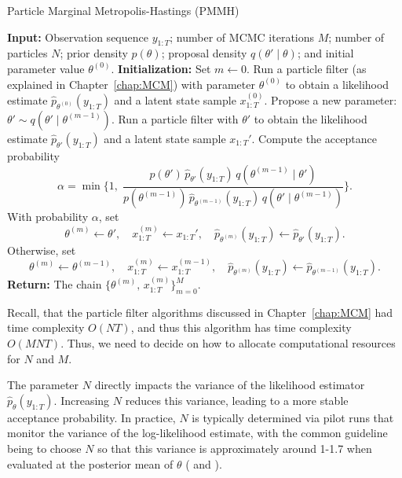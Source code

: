 \begin{algorithm}[H]
	\caption{Particle Marginal Metropolis-Hastings (PMMH)}
	\label{algo:PMMH}
	\begin{algorithmic}[1]
		\State \textbf{Input:} Observation sequence \(y_{1:T}\); number of MCMC iterations \(M\); number of particles \(N\); prior density \(p(\theta)\); proposal density \(q(\theta'\mid\theta)\); and initial parameter value \(\theta^{(0)}\).
		\State \textbf{Initialization:} Set \(m \gets 0\). Run a particle filter (as explained in Chapter~\ref{chap:MCM}) with parameter \(\theta^{(0)}\) to obtain a likelihood estimate \(\widehat{p}_{\theta^{(0)}}(y_{1:T})\) and a latent state sample \(x_{1:T}^{(0)}\).
		\State Propose a new parameter: \(\theta' \sim q(\theta'\mid\theta^{(m-1)})\).
		\State Run a particle filter with \(\theta'\) to obtain the likelihood estimate \(\widehat{p}_{\theta'}(y_{1:T})\) and a latent state sample \(x_{1:T}'\).
		\State Compute the acceptance probability
		\[
		\alpha = \min\Biggl\{1,\;\frac{p(\theta')\,\widehat{p}_{\theta'}(y_{1:T})\,q(\theta^{(m-1)}\mid\theta')}{p(\theta^{(m-1)})\,\widehat{p}_{\theta^{(m-1)}}(y_{1:T})\,q(\theta'\mid\theta^{(m-1)})}\Biggr\}.
		\]
		\State With probability \(\alpha\), set
		\[
		\theta^{(m)}\gets \theta',\quad x_{1:T}^{(m)}\gets x_{1:T}',\quad \widehat{p}_{\theta^{(m)}}(y_{1:T})\gets \widehat{p}_{\theta'}(y_{1:T}).
		\]
		\State Otherwise, set
		\[
		\theta^{(m)}\gets \theta^{(m-1)},\quad x_{1:T}^{(m)}\gets x_{1:T}^{(m-1)},\quad \widehat{p}_{\theta^{(m)}}(y_{1:T})\gets \widehat{p}_{\theta^{(m-1)}}(y_{1:T}).
		\]
		\EndFor	
		\State \textbf{Return:} The chain \(\{\theta^{(m)},\, x_{1:T}^{(m)}\}_{m=0}^{M}\).
	\end{algorithmic}
\end{algorithm}
Recall, that the particle filter algorithms discussed in Chapter~\ref{chap:MCM} had time complexity $O(NT)$, and thus this algorithm has time complexity $O(MNT)$. Thus, we need to decide on how to allocate computational resources for $N$ and $M$. 

The parameter \(N\) directly impacts the variance of the likelihood estimator \(\widehat{p}_\theta(y_{1:T})\). Increasing \(N\) reduces this variance, leading to a more stable acceptance probability. In practice, $N$ is typically determined via pilot runs that monitor the variance of the log-likelihood estimate, with the common guideline being to choose $N$ so that this variance is approximately around 1-1.7 when evaluated at the posterior mean of $\theta$ (\cite{Pitt} and \cite{gettingstarted}).

